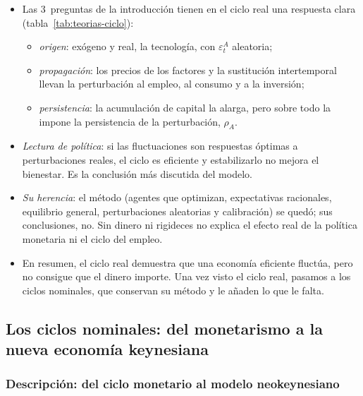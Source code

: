 \documentclass[11pt]{article}
\begin{document}
\begin{itemize}
\item Las 3~preguntas de la introducción tienen en el ciclo real una respuesta clara (tabla~\ref{tab:teorias-ciclo}):
  \begin{itemize}
  \item \emph{origen}: exógeno y real, la tecnología, con $\varepsilon^A_t$ aleatoria;
  \item \emph{propagación}: los precios de los factores y la sustitución intertemporal llevan la perturbación al empleo, al consumo y a la inversión;
  \item \emph{persistencia}: la acumulación de capital la alarga, pero sobre todo la impone la persistencia de la perturbación, $\rho_A$.
  \end{itemize}
\item \emph{Lectura de política}: si las fluctuaciones son respuestas óptimas a perturbaciones reales, el ciclo es eficiente y estabilizarlo no mejora el bienestar. Es la conclusión más discutida del modelo.
\item \emph{Su herencia}: el método (agentes que optimizan, expectativas racionales, equilibrio general, perturbaciones aleatorias y calibración) se quedó; sus conclusiones, no. Sin dinero ni rigideces no explica el efecto real de la política monetaria ni el ciclo del empleo.
\item En resumen, el ciclo real demuestra que una economía eficiente fluctúa, pero no consigue que el dinero importe. Una vez visto el ciclo real, pasamos a los ciclos nominales, que conservan su método y le añaden lo que le falta.
\end{itemize}

\subsection{Los ciclos nominales: del monetarismo a la nueva economía keynesiana}\label{sec:nek}

\subsubsection{Descripción: del ciclo monetario al modelo neokeynesiano}\label{sec:nek-descripcion}
\end{document}
